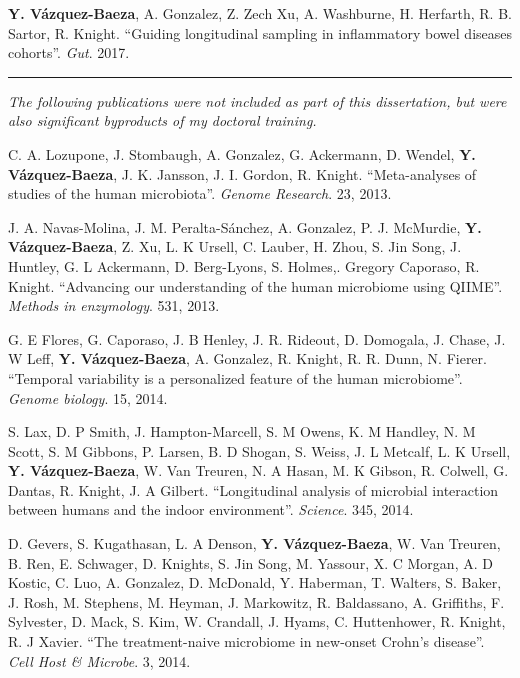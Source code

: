 \begin{frontmatter}
\begin{vitapage}
\begin{publications}
    \item \textbf{Y. V\'azquez-Baeza}, A. Gonzalez, Z. Zech Xu, A. Washburne, 
        H. Herfarth, R. B. Sartor, R. Knight. ``Guiding longitudinal sampling 
        in inflammatory bowel diseases cohorts''. \emph{Gut}. 2017.

    \item \noindent\rule[0.5ex]{\linewidth}{0.5pt}

    \textsl{The following publications were not included as part of this dissertation, but were also significant byproducts of my doctoral training.}

    \item C. A. Lozupone, J. Stombaugh, A. Gonzalez, G. Ackermann, D. Wendel, \textbf{Y. V\'azquez-Baeza}, J. K. Jansson, J. I. Gordon, R. Knight. ``Meta-analyses of studies of the human microbiota''. \emph{Genome Research}. 23, 2013.

    \item J. A. Navas-Molina, J. M. Peralta-S\'anchez, A. Gonzalez, P. J.  
        McMurdie, \textbf{Y. V\'azquez-Baeza}, Z. Xu, L. K Ursell, C. Lauber, 
        H. Zhou, S. Jin Song, J. Huntley, G. L Ackermann, D. Berg-Lyons, S.  
        Holmes,. Gregory Caporaso, R. Knight. ``Advancing our understanding of 
        the human microbiome using QIIME''. \emph{Methods in enzymology}. 531, 
        2013.

    \item G. E Flores, G. Caporaso, J. B Henley, J. R. Rideout, D. Domogala, J. Chase, J. W Leff, \textbf{Y. V\'azquez-Baeza}, A. Gonzalez, R. Knight, R. R. Dunn, N. Fierer. ``Temporal variability is a personalized feature of the human microbiome''. \emph{Genome biology}. 15, 2014.

    \item S. Lax, D. P Smith, J. Hampton-Marcell, S. M Owens, K. M Handley, N. M Scott, S. M Gibbons, P. Larsen, B. D Shogan, S. Weiss, J. L Metcalf, L. K Ursell, \textbf{Y. V\'azquez-Baeza}, W. Van Treuren, N. A Hasan, M. K Gibson, R. Colwell, G. Dantas, R. Knight, J. A Gilbert. ``Longitudinal analysis of microbial interaction between humans and the indoor environment''. \emph{Science}. 345, 2014.

    \item D. Gevers, S. Kugathasan, L. A Denson, \textbf{Y. V\'azquez-Baeza}, 
        W. Van Treuren, B. Ren, E. Schwager, D. Knights, S. Jin Song, M.  
        Yassour, X. C Morgan, A. D Kostic, C. Luo, A. Gonzalez, D. McDonald, Y.  
        Haberman, T. Walters, S. Baker, J. Rosh, M. Stephens, M. Heyman, J.  
        Markowitz, R. Baldassano, A. Griffiths, F. Sylvester, D. Mack, S. Kim, 
        W. Crandall, J. Hyams, C. Huttenhower, R. Knight, R. J Xavier. ``The 
        treatment-naive microbiome in new-onset Crohn's disease''. \emph{Cell 
        Host \& Microbe}. 3, 2014.


\end{publications}
\end{vitapage}
\end{frontmatter}
